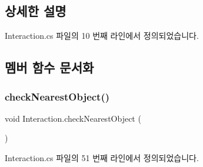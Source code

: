 \subsection{상세한 설명}


Interaction.\+cs 파일의 10 번째 라인에서 정의되었습니다.



\subsection{멤버 함수 문서화}
\mbox{\label{class_interaction_a57f6e82265f1099e49b7429615ff593f}} 
\subsubsection{\texorpdfstring{checkNearestObject()}{checkNearestObject()}}
{\footnotesize\ttfamily void Interaction.\+check\+Nearest\+Object (\begin{DoxyParamCaption}{ }\end{DoxyParamCaption})\hspace{0.3cm}{\ttfamily [private]}}



Interaction.\+cs 파일의 51 번째 라인에서 정의되었습니다.


